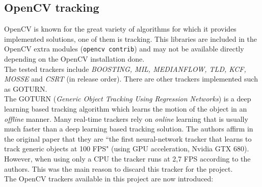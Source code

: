 \subsection{OpenCV tracking}
OpenCV is known for the great variety of algorithms for which it provides implemented solutions, one of them is tracking. This libraries are included in the OpenCV extra modules (\texttt{opencv contrib}) and may not be available directly depending on the OpenCV installation done.\\
The tested trackers include \textit{BOOSTING, MIL, MEDIANFLOW, TLD, KCF, MOSSE} and \textit{CSRT} (in release order). There are other trackers implemented such as GOTURN.\\ The GOTURN (\textit{Generic Object Tracking Using Regression Networks}) is a deep learning based tracking algorithm which learns the motion of the object in an \textit{offline} manner. Many real-time trackers rely on \textit{online} learning that is usually much faster than a deep learning based tracking solution. The authors affirm in the original paper \cite{held2016learning} that they are ``the first neural-network tracker that learns to track generic objects at 100 FPS" (using GPU acceleration, Nvidia GTX 680). However, when using only a CPU the tracker runs at 2,7 FPS according to the authors. This was the main reason to discard this tracker for the project. %
\\
The OpenCV trackers available in this project are now introduced:
